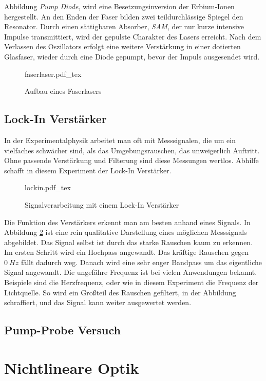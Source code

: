 Abbildung \emph{Pump Diode}, wird eine Besetzungsinversion der Erbium-Ionen
hergestellt. An den Enden der Faser bilden zwei teildurchlässige Spiegel den 
Resonator. Durch einen sättigbaren Absorber, \emph{SAM}, der nur kurze intensive
Impulse transmittiert, wird der gepulste Charakter des Lasers erreicht. Nach dem 
Verlassen des Oszillators erfolgt eine weitere Verstärkung in einer dotierten 
Glasfaser, wieder durch eine Diode gepumpt, bevor der Impuls ausgesendet wird. 
\autocite{phying, zinth}
\begin{figure}[H]
  \centering
  {faserlaser.pdf_tex}
  \caption{Aufbau eines Faserlasers}
  \label{abb:faser}
\end{figure}


    \subsection{Lock-In Verstärker}

In der Experimentalphysik arbeitet man oft mit Messsignalen, die um ein 
vielfaches schwächer sind, als das Umgebungsrauschen, das unweigerlich
Auftritt. Ohne passende Verstärkung und Filterung sind diese Messungen wertlos.
Abhilfe schafft in diesem Experiment der Lock-In Verstärker. 
\begin{figure}[hb]
  \centering
  {lockin.pdf_tex}
  \caption{Signalverarbeitung mit einem Lock-In Verstärker}
  \label{abb:lockin}
\end{figure}
Die Funktion des Verstärkers erkennt man am besten anhand eines Signals. In 
Abbildung \ref{abb:lockin} ist eine rein qualitative Darstellung eines möglichen
Messsignals abgebildet. Das Signal selbst ist durch das starke Rauschen kaum zu
erkennen. Im ersten Schritt wird ein Hochpass angewandt. Das kräftige Rauschen
gegen $\SI{0}{Hz}$ fällt dadurch weg. Danach wird eine sehr enger Bandpass um
das eigentliche Signal angewandt. Die ungefähre Frequenz ist bei vielen Anwendungen
bekannt. Beispiele sind die Herzfrequenz, oder wie in diesem Experiment die 
Frequenz der Lichtquelle. So wird ein Großteil des Rauschen gefiltert, in der 
Abbildung schraffiert, und das Signal kann weiter ausgewertet werden.

    \subsection{Pump-Probe Versuch}

\section{Nichtlineare Optik}
